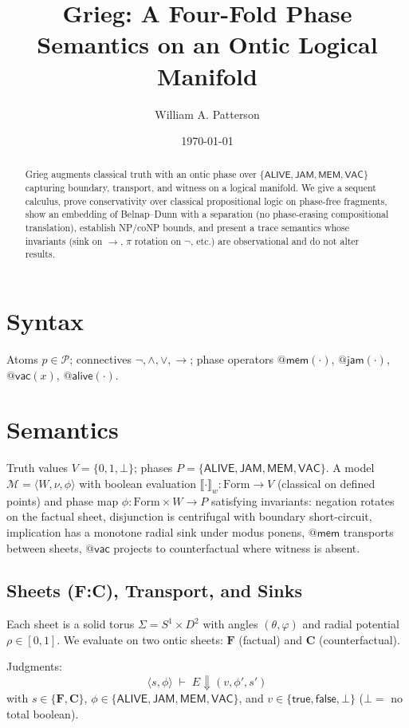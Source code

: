 \documentclass[11pt]{article}
\title{Grieg: A Four-Fold Phase Semantics on an Ontic Logical Manifold}
\author{William A. Patterson}
\date{\today}
\begin{document}
\maketitle

\begin{abstract}
Grieg augments classical truth with an ontic phase over $\{\mathsf{ALIVE},\mathsf{JAM},\mathsf{MEM},\mathsf{VAC}\}$ capturing boundary, transport, and witness on a logical manifold. We give a sequent calculus, prove conservativity over classical propositional logic on phase-free fragments, show an embedding of Belnap--Dunn with a separation (no phase-erasing compositional translation), establish NP/coNP bounds, and present a trace semantics whose invariants (sink on $\to$, $\pi$ rotation on $\neg$, etc.) are observational and do not alter results.
\end{abstract}

\section{Syntax}
Atoms $p\in\mathcal{P}$; connectives $\neg,\wedge,\vee,\to$; phase operators $\mathsf{@mem}(\cdot)$, $\mathsf{@jam}(\cdot)$, $\mathsf{@vac}(x)$, $\mathsf{@alive}(\cdot)$.

\section{Semantics}
Truth values $V=\{0,1,\bot\}$; phases $P=\{\mathsf{ALIVE},\mathsf{JAM},\mathsf{MEM},\mathsf{VAC}\}$. A model $\mathcal{M}=\langle W,\nu,\phi\rangle$ with boolean evaluation $\llbracket\cdot\rrbracket_w:\mathrm{Form}\to V$ (classical on defined points) and phase map $\phi:\mathrm{Form}\times W\to P$ satisfying invariants: negation rotates on the factual sheet, disjunction is centrifugal with boundary short-circuit, implication has a monotone radial sink under modus ponens, $\mathsf{@mem}$ transports between sheets, $\mathsf{@vac}$ projects to counterfactual where witness is absent.


\subsection{Sheets (F:C), Transport, and Sinks}
Each sheet is a solid torus $\Sigma = S^1 \times D^2$ with angles $(\theta,\varphi)$ and radial potential $\rho \in [0,1]$.
We evaluate on two ontic sheets: $\mathbf{F}$ (factual) and $\mathbf{C}$ (counterfactual).

Judgments:
\[
  \langle s,\phi \rangle \;\vdash\; E \Downarrow (v,\phi',s')
\]
with $s \in \{\mathbf{F},\mathbf{C}\}$, $\phi \in \{\mathsf{ALIVE},\mathsf{JAM},\mathsf{MEM},\mathsf{VAC}\}$,
and $v \in \{\mathsf{true},\mathsf{false},\bot\}$ ($\bot =$ no total boolean).
\end{document}
